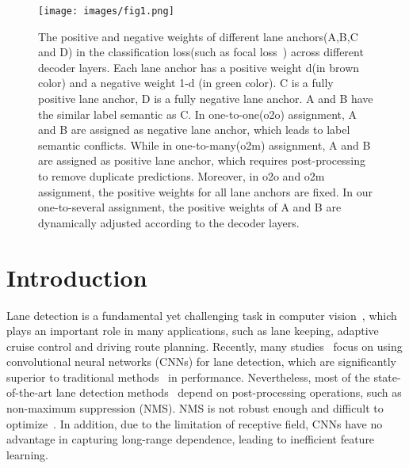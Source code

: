 \documentclass{bmvc2k}
\begin{document}
\begin{figure*}[!h]
   \begin{center}
   \texttt{[image: images/fig1.png]}
   \vspace{-0.5cm} 
   \end{center}
      \caption{The positive and negative weights of different lane anchors(A,B,C and D) in the classification 
      loss(such as focal loss~\cite{lin2017focal}) across different decoder layers. Each lane anchor has a positive weight d(in brown color) and 
      a negative weight 1-d (in green color). C is a fully positive lane anchor, D is a fully negative lane anchor. 
      A and B have the similar label semantic as C. In one-to-one(o2o) assignment, A and B are assigned as negative lane anchor, 
      which leads to label semantic conflicts. While in one-to-many(o2m) assignment, A and B are assigned as positive lane anchor, 
      which requires post-processing to remove duplicate predictions. Moreover, in o2o and o2m assignment, the positive weights for all lane anchors are fixed.
      In our one-to-several assignment, the positive weights of A and B are dynamically adjusted according to the decoder layers.}
   \vspace{-0.4cm}
   \label{fig:short1}
   \end{figure*}

   \section{Introduction}
   \label{sec:intro}
   \vspace{-0.2cm}
   Lane detection is a fundamental yet challenging task in computer vision~\cite{hou2019learning,wang2000lane,narote2018review}, 
   which plays an important role in many applications, such as lane keeping, 
   adaptive cruise control and driving route planning. Recently, many studies~\cite{lee2022robust,xu2020curvelane,chen2019pointlanenet,zheng2021resa} 
   focus on using convolutional neural networks (CNNs) for lane detection, 
   which are significantly superior to traditional methods~\cite{niu2016robust,jung2013efficient,borkar2011novel} in performance. 
   Nevertheless, most of the state-of-the-art lane detection methods~\cite{zheng2022clrnet,li2019line,tabelini2021keep} depend 
   on post-processing operations, such as non-maximum suppression (NMS). 
   NMS is not robust enough and difficult to optimize~\cite{lv2023detrs}. In addition, due to the limitation of receptive field, 
   CNNs have no advantage in capturing long-range dependence, leading to inefficient feature learning.
   
\end{document}
